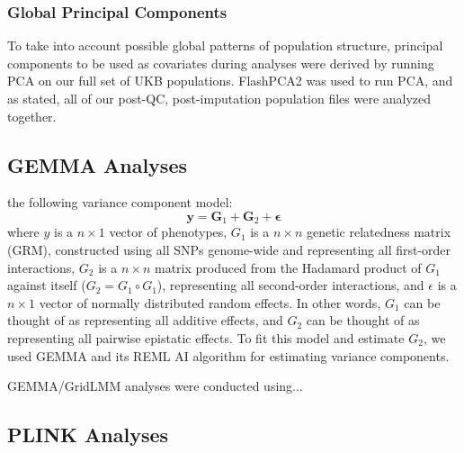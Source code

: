 \documentclass[12pt,a4paper]{article}
\begin{document}
\subsubsection{Global Principal Components}

To take into account possible global patterns of population structure, principal components to be used as covariates during analyses were derived by running PCA on our full set of UKB populations. FlashPCA2 was used to run PCA, and as stated, all of our post-QC, post-imputation population files were analyzed together.    

\subsection{GEMMA Analyses}

 the following variance component model:
\begin{equation}\label{InterPath-GEMMA-Equation-Model}
 \textbf{y} = \textbf{G}_1 + \textbf{G}_2 + \boldsymbol{\epsilon}
\end{equation}
where $y$ is a $n \times 1$ vector of phenotypes, $G_1$ is a $n \times n$ genetic relatedness matrix (GRM), constructed using all SNPs genome-wide and representing all first-order interactions, $G_2$ is a $n \times n$ matrix produced from the Hadamard product of $G_1$ against itself ($G_2 = G_1 \circ G_1$), representing all second-order interactions, and $\epsilon$ is a $n \times 1$ vector of normally distributed random effects. In other words, $G_1$ can be thought of as representing all additive effects, and $G_2$ can be thought of as representing all pairwise epistatic effects. To fit this model and estimate $G_2$, we used GEMMA \citep{Zhou2012} and its REML AI algorithm for estimating variance components.

GEMMA/GridLMM analyses were conducted using...

\subsection{PLINK Analyses}
\end{document}
